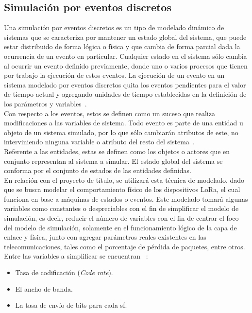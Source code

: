 \begin{justify}
\section{Simulación por eventos discretos}
Una simulación por eventos discretos es un tipo de modelado dinámico de sistemas que se caracteriza por mantener un estado global del sistema, que puede estar distribuido de forma lógica o física y que cambia de forma parcial dada la ocurrencia de un evento en particular. Cualquier estado en el sistema sólo cambia al ocurrir un evento definido previamente, donde uno o varios procesos que tienen por trabajo la ejecución de estos eventos. La ejecución de un evento en un sistema modelado por eventos discretos quita los eventos pendientes para el valor de tiempo actual y agregando unidades de tiempo establecidas en la definición de los parámetros y variables~\cite{simubook}.\\
Con respecto a los eventos, estos se definen como un suceso que realiza modificaciones a las variables de sistema. Todo evento es parte de una entidad u objeto de un sistema simulado, por lo que sólo cambiarán atributos de este, no interviniendo ninguna variable o atributo del resto del sistema~\cite{simubook}.\\
Referente a las entidades, estas se definen como los objetos o actores que en conjunto representan al sistema a simular. El estado global del sistema se conforma por el conjunto de estados de las entidades definidas.\\
En relación con el proyecto de título, se utilizará esta técnica de modelado, dado que se busca modelar el comportamiento físico de los dispositivos LoRa, el cual funciona en base a máquinas de estados o eventos. Este modelado tomará algunas variables como constantes o despreciables con el fin de simplificar el modelo de simulación, es decir, reducir el número de variables con el fin de centrar el foco del modelo de simulación, solamente en el funcionamiento lógico de la capa de enlace y física, junto con agregar parámetros reales existentes en las telecomunicaciones, tales como el porcentaje de pérdida de paquetes, entre otros.\\
Entre las variables a simplificar se encuentran ~\cite{orange}:\\
\begin{itemize}
\item Tasa de codificación (\textit{Code rate}).
\item El ancho de banda.
\item La tasa de envío de bits para cada \gls{sf}.

\end{itemize}
\end{justify}
